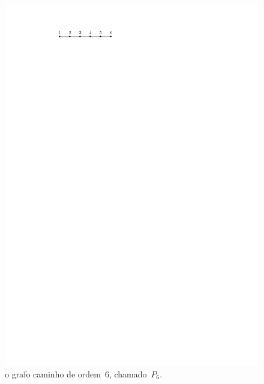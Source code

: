 \documentclass[12pt, a4paper]{article}
\theoremstyle{definition}
\begin{document}
\begin{figure}[H]
    \centering
    \includegraphics{caminho.pdf}
    \caption{o grafo caminho de ordem~$6$, chamado~$P_6$.}
    \label{fig:caminho}
\end{figure}
\end{document}
